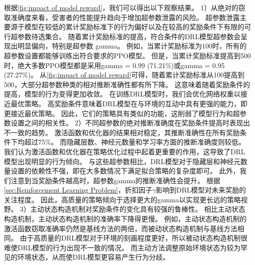 根据\autoref{fig:impact of model reward}，我们可以得出以下观察结果。
1）从绝对的窃取准确度来看，受害者的性能提升趋向于增加超参数泄露的风险。
超参数泄露主要源于模型在较低的累计奖励标准下的行为偏好以及在较高的奖励条件下有限的可行超参数待选集合。
随着累计奖励标准的提高，符合条件的DRL模型超参数会呈现出明显偏向，特别是超参数 gamma。
例如，当累计奖励标准为100时，所有的超参数设置都能够训练出符合要求的PPO模型。
但是，当累计奖励标准提高到500时，绝大多数PPO模型都是采用gamma = 0.99 (71.21\%)或gamma = 0.95 (27.27\%)。
从\autoref{fig:impact of model reward}可得，随着累计奖励标准从100提高到500，大部分超参数种类的相对推断准确性都有所下降。
这意味着随着奖励条件的提高，模型的行为变得更加收敛。
在训练DRL模型时，我们会优化网络权重以接近最优策略。
高奖励条件意味着DRL模型在与环境的互动中具有更强的能力，即更接近最优策略。
因此，它们的策略具有类似的功能，这削弱了模型行为和超参数设置之间的相关性。
2）不同超参数的绝对推断准确度在奖励条件提高时表现出不一致的趋势。
激活函数和优化器的结果相对稳定，其推断准确性在所有奖励条件下均超过75\%。
而隐藏层数、神经元数量和学习率方面的推断准确度则较低。
我们认为激活函数和优化器在策略优化过程中起着更重要的作用，这导致了DRL模型出现明显的行为倾向。
与这些超参数相比，DRL模型对于隐藏层和神经元数量设置的依赖性不强，即在大多数情况下满足拟合策略的复杂度即可。
此外，我们注意到当奖励条件越高时，超参数gamma的推断准确性会提升。
根据\autoref{sec:Reinforcement Learning Problem}，折扣因子$\gamma$影响到DRL模型对未来奖励的关注程度。
因此，高质量的策略倾向于选择更大的gamma以实现更长远的策略视野。
3）主动状态构造机制对奖励条件的变化具有较强的鲁棒性。
相比主动状态构造机制，主动状态构造机制的准确率下降得更慢。
例如，主动状态构造机制的激活函数窃取准确率仍然是基线方法的两倍，而被动状态构造机制与基线方法相同。
由于高质量的DRL模型对于环境的刻画程度更好，所以被动状态构造机制很难使DRL模型的行为出现不一致的情况。
而主动方法调整原始环境状态为较为罕见的环境状态，从而使DRL模型更容易产生行为分歧。

